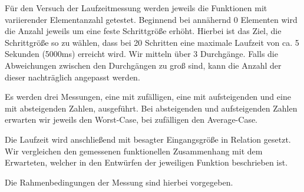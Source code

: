 \documentclass[11pt]{article}
\begin{document}
    Für den Versuch der Laufzeitmessung werden jeweils die Funktionen mit
    variierender Elementanzahl getestet. Beginnend bei
    annähernd 0 Elementen wird die Anzahl jeweils um eine feste Schrittgröße
    erhöht. Hierbei ist das Ziel, die Schrittgröße so zu wählen, dass bei 20
    Schritten eine maximale Laufzeit von ca. 5 Sekunden (5000ms) erreicht
    wird. Wir mitteln über 3 Durchgänge.
    Falls die Abweichungen zwischen den Durchgängen zu groß sind, kann die
    Anzahl der dieser nachträglich angepasst werden.

    Es werden drei Messungen, eine mit zufälligen, eine mit
    aufsteigenden und eine mit absteigenden Zahlen, ausgeführt.
    Bei absteigenden und aufsteigenden Zahlen erwarten wir jeweils den
    Worst-Case, bei zufälligen den Average-Case.

    Die Laufzeit wird anschließend mit besagter Eingangsgröße in Relation gesetzt.
    Wir vergleichen den gemessenen funktionellen Zusammenhang mit dem Erwarteten,
    welcher in den Entwürfen der jeweiligen Funktion beschrieben ist.

    Die Rahmenbedingungen der Messung sind hierbei vorgegeben.
\end{document}
